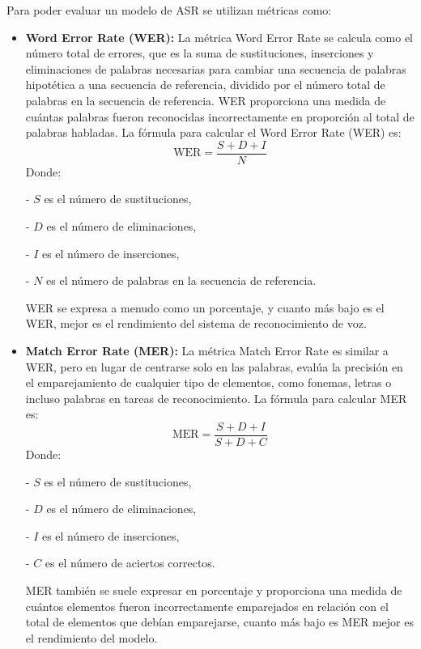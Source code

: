 \documentclass[conference]{IEEEtran}
\begin{document}
Para poder evaluar un modelo de ASR se utilizan métricas como:
\begin{itemize}
    \item \textbf{Word Error Rate (WER):} La métrica Word Error Rate se calcula como el número total de errores, que es la suma de sustituciones, inserciones y eliminaciones de palabras necesarias para cambiar una secuencia de palabras hipotética a una secuencia de referencia, dividido por el número total de palabras en la secuencia de referencia. WER proporciona una medida de cuántas palabras fueron reconocidas incorrectamente en proporción al total de palabras habladas.
    La fórmula para calcular el Word Error Rate (WER) es:
    \begin{equation}
        \text{WER} = \frac{S + D + I}{N}
    \end{equation}
    Donde:
    
    - \( S \) es el número de sustituciones,
    
    - \( D \) es el número de eliminaciones,
    
    - \( I \) es el número de inserciones,
    
    - \( N \) es el número de palabras en la secuencia de referencia.
    
    WER se expresa a menudo como un porcentaje, y cuanto más bajo es el WER, mejor es el rendimiento del sistema de reconocimiento de voz.
    
    \item \textbf{ Match Error Rate (MER):} La métrica Match Error Rate es similar a WER, pero en lugar de centrarse solo en las palabras, evalúa la precisión en el emparejamiento de cualquier tipo de elementos, como fonemas, letras o incluso palabras en tareas de reconocimiento. La fórmula para calcular MER es:
    \begin{equation}
        \text{MER} = \frac{S + D + I}{S + D + C}
    \end{equation}
    Donde:
    
    - \( S \) es el número de sustituciones,
    
    - \( D \) es el número de eliminaciones,
    
    - \( I \) es el número de inserciones,
    
    - \( C \) es el número de aciertos correctos.
    
    MER también se suele expresar en porcentaje y proporciona una medida de cuántos elementos fueron incorrectamente emparejados en relación con el total de elementos que debían emparejarse, cuanto más bajo es MER mejor es el rendimiento del modelo.
    

\end{itemize}
\end{document}
